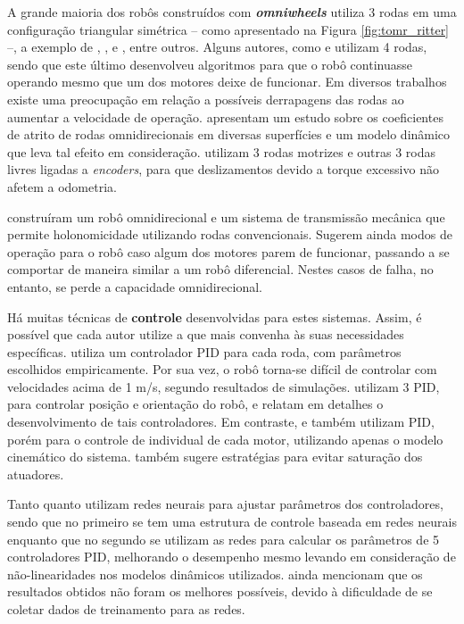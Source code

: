 A grande maioria dos robôs construídos com \textbf{\emph{omniwheels}} utiliza 3 rodas em uma configuração triangular simétrica -- como apresentado na Figura \ref{fig:tomr_ritter} --, a exemplo de \cite{ritter2016modelagem}, \cite{samani2007comprehensive}, \cite{williams2002dynamic} e \cite{indiveri2009swedish}, entre outros. Alguns autores, como \cite{krinkin2015design} e \cite{rojas2006holonomic} utilizam 4 rodas, sendo que este último desenvolveu algoritmos para que o robô continuasse operando mesmo que um dos motores deixe de funcionar. Em diversos trabalhos existe uma preocupação em relação a possíveis derrapagens das rodas ao aumentar a velocidade de operação. \cite{williams2002dynamic} apresentam um estudo sobre os coeficientes de atrito de rodas omnidirecionais em diversas superfícies e um modelo dinâmico que leva tal efeito em consideração. \cite{samani2007comprehensive} utilizam 3 rodas motrizes e outras 3 rodas livres ligadas a \textit{encoders}, para que deslizamentos devido a torque excessivo não afetem a odometria.

\cite{jung2001fault} construíram um robô omnidirecional e um sistema de transmissão mecânica que permite holonomicidade utilizando rodas convencionais. Sugerem ainda modos de operação para o robô caso algum dos motores parem de funcionar, passando a se comportar de maneira similar a um robô diferencial. Nestes casos de falha, no entanto, se perde a capacidade omnidirecional.

Há muitas técnicas de \textbf{controle} desenvolvidas para estes sistemas. Assim, é possível que cada autor utilize a que mais convenha às suas necessidades específicas. \cite{ritter2016modelagem} utiliza um controlador PID para cada roda, com parâmetros escolhidos empiricamente. Por sua vez, o robô torna-se difícil de controlar com velocidades acima de 1 m/s, segundo resultados de simulações. \cite{samani2007comprehensive} utilizam 3 PID, para controlar posição e orientação do robô, e relatam em detalhes o desenvolvimento de tais controladores. Em contraste, \cite{rojas2006holonomic} e \cite{indiveri2009swedish} também utilizam PID, porém para o controle de individual de cada motor, utilizando apenas o modelo cinemático do sistema. \cite{indiveri2009swedish} também sugere estratégias para evitar saturação dos atuadores.

Tanto \cite{treesatayapun2011discrete} quanto \cite{oubbati2005velocity} utilizam redes neurais para ajustar parâmetros dos controladores, sendo que no primeiro se tem uma estrutura de controle baseada em redes neurais enquanto que no segundo se utilizam as redes para calcular os parâmetros de 5 controladores PID, melhorando o desempenho mesmo levando em consideração de não-linearidades nos modelos dinâmicos utilizados. \cite{oubbati2005velocity} ainda mencionam que os resultados obtidos não foram os melhores possíveis, devido à dificuldade de se coletar dados de treinamento para as redes.

